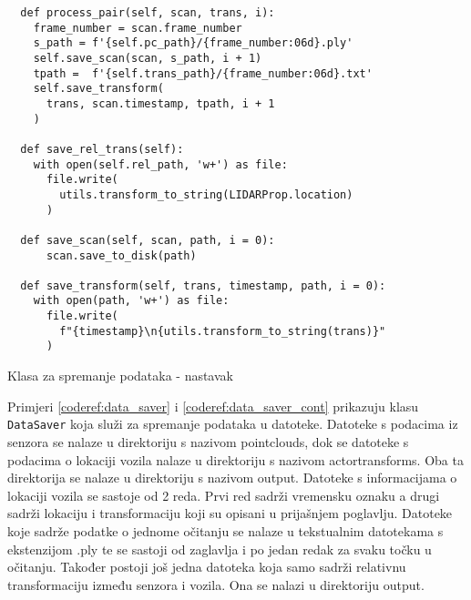 \begin{listing}[h!]
  \begin{verbatim}
  def process_pair(self, scan, trans, i):
    frame_number = scan.frame_number
    s_path = f'{self.pc_path}/{frame_number:06d}.ply'
    self.save_scan(scan, s_path, i + 1)
    tpath =  f'{self.trans_path}/{frame_number:06d}.txt'
    self.save_transform(
      trans, scan.timestamp, tpath, i + 1
    )

  def save_rel_trans(self):
    with open(self.rel_path, 'w+') as file:
      file.write(
        utils.transform_to_string(LIDARProp.location)
      )

  def save_scan(self, scan, path, i = 0):
      scan.save_to_disk(path)

  def save_transform(self, trans, timestamp, path, i = 0):
    with open(path, 'w+') as file:
      file.write(
        f"{timestamp}\n{utils.transform_to_string(trans)}"
      )
  \end{verbatim}
  \caption{Klasa za spremanje podataka - nastavak}
  \label{coderef:data_saver_cont}
\end{listing}

Primjeri \ref{coderef:data_saver} i \ref{coderef:data_saver_cont} prikazuju klasu \texttt{DataSaver} koja služi za spremanje podataka u datoteke. Datoteke s podacima iz senzora se nalaze u direktoriju s nazivom pointclouds, dok se datoteke s podacima o lokaciji vozila nalaze u direktoriju s nazivom actortransforms. Oba ta direktorija se nalaze u direktoriju s nazivom output. Datoteke s informacijama o lokaciji vozila se sastoje od 2 reda. Prvi red sadrži vremensku oznaku a drugi sadrži lokaciju i transformaciju koji su opisani u prijašnjem poglavlju. Datoteke koje sadrže podatke o jednome očitanju se nalaze u tekstualnim datotekama s ekstenzijom .ply te se sastoji od zaglavlja i po jedan redak za svaku točku u očitanju. Također postoji još jedna datoteka koja samo sadrži relativnu transformaciju između senzora i vozila. Ona se nalazi u direktoriju output.